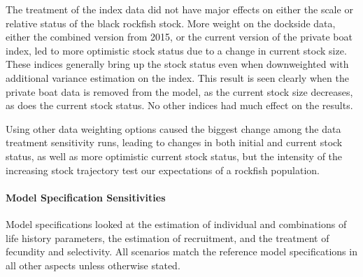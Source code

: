 \documentclass[11pt,
  english,
  letterpaper,
]{article}
\begin{document}
The treatment of the index data did not have major effects on either the scale or relative status of the black rockfish stock. More weight on the dockside data, either the combined version from 2015, or the current version of the private boat index, led to more optimistic stock status due to a change in current stock size. These indices generally bring up the stock status even when downweighted with additional variance estimation on the index. This result is seen clearly when the private boat data is removed from the model, as the current stock size decreases, as does the current stock status. No other indices had much effect on the results.

Using other data weighting options caused the biggest change among the data treatment sensitivity runs, leading to changes in both initial and current stock status, as well as more optimistic current stock status, but the intensity of the increasing stock trajectory test our expectations of a rockfish population.

\hypertarget{senstivities}{%
\paragraph{Model Specification Sensitivities}\label{senstivities}}

Model specifications looked at the estimation of individual and combinations of life history parameters, the estimation of recruitment, and the treatment of fecundity and selectivity. All scenarios match the reference model specifications in all other aspects unless otherwise stated.
\end{document}
